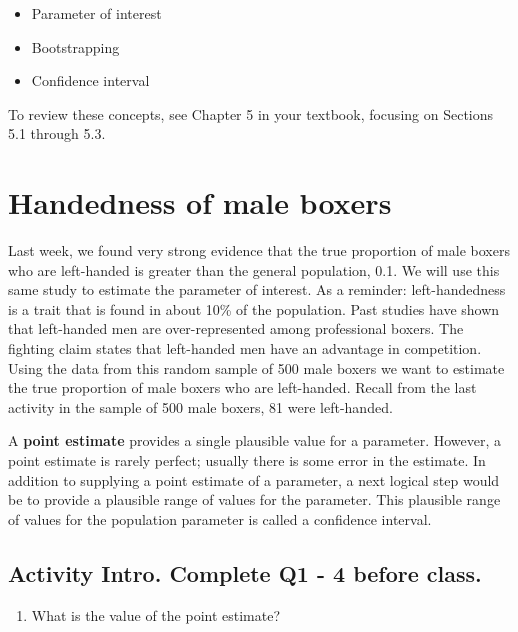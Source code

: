 \documentclass[
]{report}
\providecommand{\tightlist}{%
  \setlength{\itemsep}{0pt}\setlength{\parskip}{0pt}}
\begin{document}
\begin{itemize}
\item
  Parameter of interest
\item
  Bootstrapping
\item
  Confidence interval
\end{itemize}

To review these concepts, see Chapter 5 in your textbook, focusing on Sections 5.1 through 5.3.

\hypertarget{handedness-of-male-boxers}{%
\section{Handedness of male boxers}\label{handedness-of-male-boxers}}

Last week, we found very strong evidence that the true proportion of male boxers who are left-handed is greater than the general population, 0.1. We will use this same study to estimate the parameter of interest. As a reminder: left-handedness is a trait that is found in about 10\% of the population. Past studies have shown that left-handed men are over-represented among professional boxers. The fighting claim states that left-handed men have an advantage in competition. Using the data from this random sample of 500 male boxers we want to estimate the true proportion of male boxers who are left-handed. Recall from the last activity in the sample of 500 male boxers, 81 were left-handed.

A \textbf{point estimate} provides a single plausible value for a parameter. However, a point estimate is rarely perfect; usually there is some error in the estimate. In addition to supplying a point estimate of a parameter, a next logical step would be to provide a plausible range of values for the parameter. This plausible range of values for the population parameter is called a confidence interval.

\hypertarget{activity-intro.-complete-q1---4-before-class.}{%
\subsection*{Activity Intro. Complete Q1 - 4 before class.}\label{activity-intro.-complete-q1---4-before-class.}}

\begin{enumerate}
\def\labelenumi{\arabic{enumi}.}
\tightlist
\item
  What is the value of the point estimate?
\end{enumerate}
\end{document}
